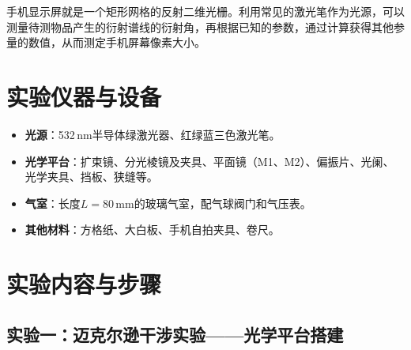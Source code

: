 \documentclass[UTF8]{article}
\begin{document}
手机显示屏就是一个矩形网格的反射二维光栅。利用常见的激光笔作为光源，可以测量待测物品产生的衍射谱线的衍射角，再根据已知的参数，通过计算获得其他参量的数值，从而测定手机屏幕像素大小。

\section{实验仪器与设备}

\begin{itemize}
    \item \textbf{光源}：532\,nm半导体绿激光器、红绿蓝三色激光笔。
    \item \textbf{光学平台}：扩束镜、分光棱镜及夹具、平面镜（M1、M2）、偏振片、光阑、光学夹具、挡板、狭缝等。
    \item \textbf{气室}：长度$L = 80\,\mathrm{mm}$的玻璃气室，配气球阀门和气压表。
    \item \textbf{其他材料}：方格纸、大白板、手机自拍夹具、卷尺。
\end{itemize}

\section{实验内容与步骤}

\subsection{实验一：迈克尔逊干涉实验——光学平台搭建}
\end{document}

